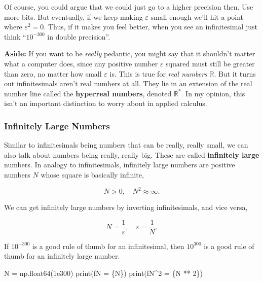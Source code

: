 \documentclass[
  letterpaper,
  DIV=11,
  numbers=noendperiod]{scrreprt}
\newenvironment{Shaded}{\begin{snugshade}}{\end{snugshade}}
\newcommand{\BuiltInTok}[1]{\textcolor[rgb]{0.00,0.23,0.31}{#1}}
\newcommand{\DecValTok}[1]{\textcolor[rgb]{0.68,0.00,0.00}{#1}}
\newcommand{\FloatTok}[1]{\textcolor[rgb]{0.68,0.00,0.00}{#1}}
\newcommand{\NormalTok}[1]{\textcolor[rgb]{0.00,0.23,0.31}{#1}}
\newcommand{\OperatorTok}[1]{\textcolor[rgb]{0.37,0.37,0.37}{#1}}
\newcommand{\SpecialCharTok}[1]{\textcolor[rgb]{0.37,0.37,0.37}{#1}}
\newcommand{\SpecialStringTok}[1]{\textcolor[rgb]{0.13,0.47,0.30}{#1}}
\begin{document}
Of course, you could argue that we could just go to a higher precision
then. Use more bits. But eventually, if we keep making \(\varepsilon\)
small enough we'll hit a point where \(\varepsilon^2 = 0\). Thus, if it
makes you feel better, when you see an infinitesimal just think
``\(10^{-300}\) in double precision''.

\textbf{Aside:} If you want to be \emph{really} pedantic, you might say
that it shouldn't matter what a computer does, since any positive number
\(\varepsilon\) squared must still be greater than zero, no matter how
small \(\varepsilon\) is. This is true for \emph{real numbers}
\(\mathbb{R}\). But it turns out infinitesimals aren't real numbers at
all. They lie in an extension of the real number line called the
\textbf{hyperreal numbers}, denoted \(\mathbb{R}^*\). In my opinion,
this isn't an important distinction to worry about in applied calculus.

\hypertarget{infinitely-large-numbers}{%
\subsubsection{Infinitely Large
Numbers}\label{infinitely-large-numbers}}

Similar to infinitesimals being numbers that can be really, really
small, we can also talk about numbers being really, really big. These
are called \textbf{infinitely large} numbers. In analogy to
infinitesimals, infinitely large numbers are positive numbers \(N\)
whose square is basically infinite,

\[N > 0, \quad N^2 \approx \infty.\]

We can get infinitely large numbers by inverting infinitesimals, and
vice versa,

\[N = \frac{1}{\varepsilon}, \quad \varepsilon = \frac{1}{N}.\]

If \(10^{-300}\) is a good rule of thumb for an infinitesimal, then
\(10^{300}\) is a good rule of thumb for an infinitely large number.

\begin{Shaded}
\begin{Highlighting}[]

\NormalTok{N }\OperatorTok{=}\NormalTok{ np.float64(}\FloatTok{1e300}\NormalTok{)}
\BuiltInTok{print}\NormalTok{(}\SpecialStringTok{f\textquotesingle{}N = }\SpecialCharTok{\{}\NormalTok{N}\SpecialCharTok{\}}\SpecialStringTok{\textquotesingle{}}\NormalTok{)}
\BuiltInTok{print}\NormalTok{(}\SpecialStringTok{f\textquotesingle{}N\^{}2 = }\SpecialCharTok{\{}\NormalTok{N }\OperatorTok{**} \DecValTok{2}\SpecialCharTok{\}}\SpecialStringTok{\textquotesingle{}}\NormalTok{)}
\end{Highlighting}
\end{Shaded}
\end{document}
